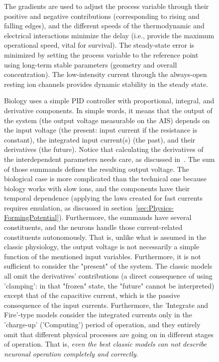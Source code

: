 \begin{figure}
The gradients are used to adjust the process variable through their positive and negative contributions (corresponding to rising and falling edges), and the different speeds of the thermodynamic and electrical interactions minimize the delay (i.e., provide the maximum operational speed, vital for survival).
The steady-state error is minimized by setting the process variable to the reference point using long-term stable parameters (geometry and overall concentration). The low-intensity current through the always-open resting ion channels provides dynamic stability in the steady state.%

\else

Biology uses a simple \gls{PID} controller with proportional, integral, and derivative components. 
In simple words, it means that the output of the system (the output voltage measurable on the \gls{AIS}) depends on the input voltage (the present: input current if the resistance is constant),
the integrated input current(s) (the past), and their derivatives (the future). Notice that calculating the derivatives of the interdependent parameters needs care, as discussed in~\cite{MechanicalPropertiesNerves:2025}. The sum of those summands defines the resulting output voltage. 
The biological case is more complicated than the technical one because biology works with slow ions, and the components have
their temporal dependence (applying the laws created for fast currents requires emulation, as discussed in section~\ref{sec:Physics-FormingPotential}). Furthermore, the summands have several constituents, and the neurons handle those current-related constituents autonomously.
That is, unlike what is assumed in the classic physiology,
the output voltage is not necessarily a simple
function of the mentioned input variables.
Furthermore, it is not sufficient to consider the "present" of the system.
The classic models all omit the derivatives' contributions (a direct consequence of using 'clamping': in that "frozen" state, the "future" cannot be interpreted)
except that of the capacitive current, which is the passive consequence of the input currents.
Furthermore, the 'Integrate and Fire'-type models
consider the integrated currents only in the 'charge-up' ('Computing') period of operation, and they entirely omit that different physical processes are going on in different stages of operation.
That is, \textit{even the best classic models can not describe neuronal operation completely and correctly}.



\end{figure}
